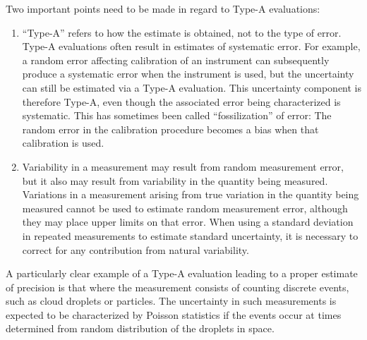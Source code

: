 \documentclass[12pt,twoside,english]{article}\usepackage[]{graphicx}\usepackage[]{color}
\begin{document}
{{\begin{appendices}
Two important points need to be made in regard to Type-A evaluations:  
\begin{enumerate}
\item ``Type-A'' refers to how the estimate is obtained, not to the type of error. Type-A evaluations often result in estimates of systematic error. For example, a random error affecting calibration of an instrument can subsequently produce a systematic error when the instrument is used, but the uncertainty can still be estimated via a Type-A evaluation. This uncertainty component is therefore Type-A, even though the associated error being characterized is systematic. This has sometimes been called ``fossilization'' of error: The random error in the calibration procedure becomes a bias when that calibration is used.  
\item Variability in a measurement may result from random measurement error, but it also may result from variability in the quantity being measured. Variations in a measurement arising from true variation in the quantity being measured cannot be used to estimate random measurement error, although they may place upper limits on that error. When using a standard deviation in repeated measurements to estimate standard uncertainty, it is necessary to correct for any contribution from natural variability.  
\end{enumerate}
A particularly clear example of a Type-A evaluation leading to a proper estimate of precision is that where the measurement consists of counting discrete events, such as cloud droplets or particles. The uncertainty in such measurements is expected to be characterized by Poisson statistics if the events occur at times determined from random distribution of the droplets in space. 


\end{appendices}}}
\end{document}
